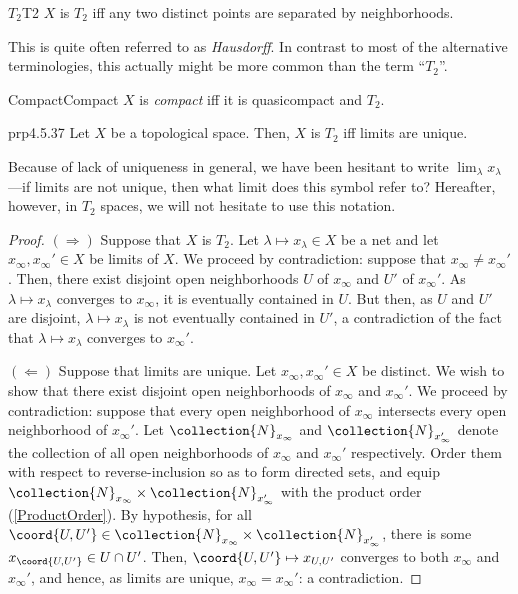 \begin{dfn}{$T_2$}{T2}
$X$ is \emph{$T_2$} iff any two distinct points are separated by neighborhoods.
\begin{rmk}
This is quite often referred to as \emph{Hausdorff}.  In contrast to most of the alternative terminologies, this actually might be more common than the term ``$T_2$''.
\end{rmk}
\end{dfn}
\begin{dfn}{Compact}{Compact}
$X$ is \emph{compact} iff it is quasicompact and $T_2$.
\end{dfn}
\begin{prp}{}{prp4.5.37}
Let $X$ be a topological space.  Then, $X$ is $T_2$ iff limits are unique.
\begin{rmk}
Because of lack of uniqueness in general, we have been hesitant to write $\lim _\lambda x_\lambda$---if limits are not unique, then what limit does this symbol refer to?  Hereafter, however, in $T_2$ spaces, we will not hesitate to use this notation.
\end{rmk}
\begin{proof}
$(\Rightarrow )$ Suppose that $X$ is $T_2$.  Let $\lambda \mapsto x_\lambda \in X$ be a net and let $x_\infty ,x_\infty '\in X$ be limits of $X$.  We proceed by contradiction:  suppose that $x_\infty \neq x_\infty '$.  Then, there exist disjoint open neighborhoods $U$ of $x_\infty$ and $U'$ of $x_\infty '$.  As $\lambda \mapsto x_\lambda$ converges to $x_\infty$, it is eventually contained in $U$.  But then, as $U$ and $U'$ are disjoint, $\lambda \mapsto x_\lambda$ is not eventually contained in $U'$, a contradiction of the fact that $\lambda \mapsto x_{\lambda}$ converges to $x_{\infty}'$.

\blankline
\noindent
$(\Leftarrow )$ Suppose that limits are unique.  Let $x_\infty ,x_\infty '\in X$ be distinct.  We wish to show that there exist disjoint open neighborhoods of $x_\infty$ and $x_\infty '$.  We proceed by contradiction:  suppose that every open neighborhood of $x_\infty$ intersects every open neighborhood of $x_\infty '$.  Let $\collection{N}_{x_{\infty}}$ and $\collection{N}_{x_{\infty}'}$ denote the collection of all open neighborhoods of $x_{\infty}$ and $x_{\infty}'$ respectively.  Order them with respect to reverse-inclusion so as to form directed sets, and equip $\collection{N}_{x_{\infty}}\times \collection{N}_{x_{\infty}'}$ with the product order (\cref{ProductOrder}).  By hypothesis, for all $\coord{U,U'}\in \collection{N}_{x_{\infty}}\times \collection{N}_{x_{\infty}'}$, there is some $x_{\coord{U,U'}}\in U\cap U'$.  Then, $\coord{U,U'}\mapsto x_{U,U'}$ converges to both $x_{\infty}$ and $x_{\infty}'$, and hence, as limits are unique, $x_{\infty}=x_{\infty}'$:  a contradiction.
\end{proof}
\end{prp}

